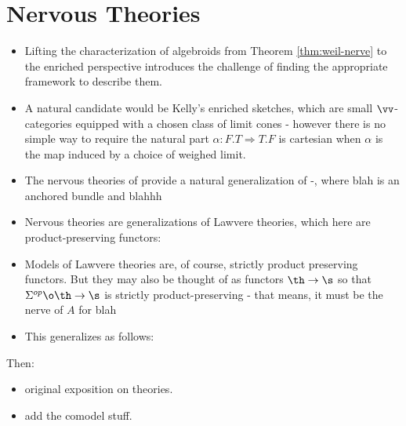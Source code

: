 \section{Nervous Theories}%
\label{sec:nervous_theories}

\begin{itemize}
	\item Lifting the characterization of algebroids from Theorem \ref{thm:weil-nerve} to the enriched perspective introduces the challenge of finding the appropriate framework to describe them.
	\item A natural candidate would be Kelly's enriched sketches, which are small $\vv$-categories equipped with a chosen class of limit cones - however there is no simple way to require the natural part $\alpha: F.T \Rightarrow T.F$ is cartesian when $\alpha$ is the map induced by a choice of weighed limit.
	\item The nervous theories of \cite{Bourke2019} provide a natural generalization of -, where blah is an anchored bundle and blahhh 
\end{itemize}

\begin{itemize}
	\item Nervous theories are generalizations of Lawvere theories, which here are product-preserving functors:
	\item Models of Lawvere theories are, of course, strictly product preserving functors. But they may also be thought of as functors $\th \to \s$ so that $\Sigma^{op} \o \th \to \s$ is strictly product-preserving - that means, it must be the nerve of $A$ for blah
	\item This generalizes as follows:
\end{itemize}

Then: 
\begin{itemize}
	\item original exposition on theories.
	\item add the comodel stuff.
\end{itemize}

